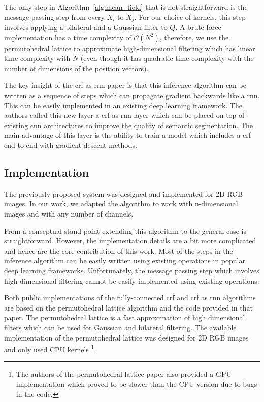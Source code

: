 \documentclass{article}
\begin{document}
The only step in Algorithm~\ref{alg:mean_field} that is not straightforward is the message passing step from every $X_i$ to $X_j$. 
For our choice of kernels, this step involves applying a bilateral and a Gaussian filter to $Q$.
A brute force implementation has a time complexity of $\mathcal{O}(N^2)$, therefore, we use the permutohedral lattice to approximate high-dimensional filtering \cite{adams2010fast} which has linear time complexity with $N$ (even though it has quadratic time complexity with the number of dimensions of the position vectors).


The key insight of the \gls{crf} as \gls{rnn} paper \cite{CRFasRNN} is that this inference algorithm can be written as a sequence of steps which can propagate gradient backwards like a \gls{rnn}.
This can be easily implemented in an existing deep learning framework.
The authors called this new layer a \gls{crf} as \gls{rnn} layer which can be placed on top of existing \gls{cnn} architectures to improve the quality of semantic segmentation.
The main advantage of this layer is the ability to train a model which includes a \gls{crf} end-to-end with gradient descent methods.

\subsection{Implementation}

The previously proposed system was designed and implemented for 2D RGB images.
In our work, we adapted the algorithm to work with n-dimensional images and with any number of channels.

From a conceptual stand-point extending this algorithm to the general case is straightforward.
However, the implementation details are a bit more complicated and hence are the core contribution of this work.
Most of the steps in the inference algorithm can be easily written using existing operations in popular deep learning frameworks.
Unfortunately, the message passing step which involves high-dimensional filtering cannot be easily implemented using existing operations.

Both public implementations of the fully-connected \gls{crf} and \gls{crf} as \gls{rnn} algorithms are based on the permutohedral lattice algorithm \cite{adams2010fast} and the code provided in that paper.
The permutohedral lattice is a fast approximation of high dimensional filters which can be used for Gaussian and bilateral filtering.
The available implementation of the permutohedral lattice was designed for 2D RGB images and only used CPU kernels \footnote{The authors of the permutohedral lattice paper also provided a GPU implementation which proved to be slower than the CPU version due to bugs in the code.}.
\end{document}
